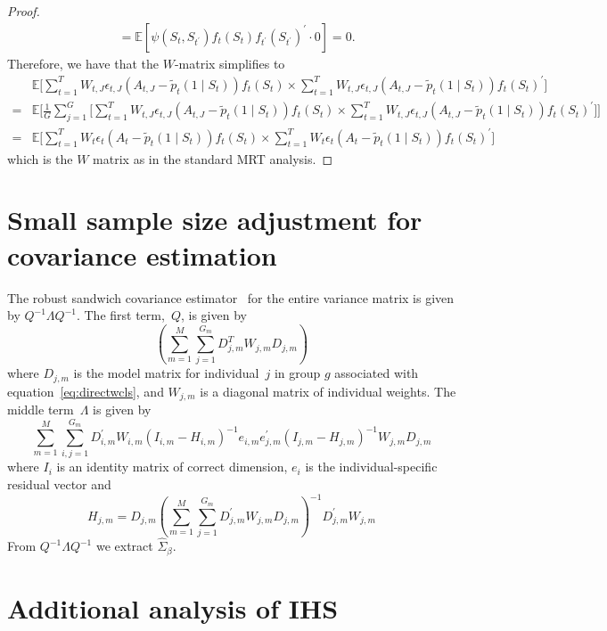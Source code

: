 \documentclass[12pt]{article}
\begin{document}
\begin{proof}
\begin{align*}
&= \mathbb{E} \left[ \psi (S_t, S_{t^\prime}) f_t (S_t) f_{t^\prime} (S_{t^\prime})^\prime \cdot 0 \right] = 0.
\end{align*}
Therefore, we have that the $W$-matrix simplifies to
\begin{align*}
 &\mathbb{E} \bigg[ \sum_{t=1}^T W_{t,J} \epsilon_{t,J} (A_{t,J} - \tilde{p}_t( 1 \mid S_t)) f_t(S_t) \times \sum_{t=1}^T W_{t,J} \epsilon_{t,J} (A_{t,J} - \tilde{p}_t( 1 \mid S_t)) f_t(S_t)^\prime
                  \bigg] \\
 =&\mathbb{E} \bigg[\frac{1}{G}  \sum_{j=1}^G \bigg[ \sum_{t=1}^T W_{t,J} \epsilon_{t,J} (A_{t,J} - \tilde{p}_t( 1 \mid S_t)) f_t(S_t) \times \sum_{t=1}^T W_{t,J} \epsilon_{t,J} (A_{t,J} - \tilde{p}_t( 1 \mid S_t)) f_t(S_t)^\prime
                  \bigg] \bigg] \\
 =&\mathbb{E} \bigg[ \sum_{t=1}^T W_{t} \epsilon_{t} (A_{t} - \tilde{p}_t( 1 \mid S_t)) f_t(S_t) \times \sum_{t=1}^T W_{t} \epsilon_{t} (A_{t} - \tilde{p}_t( 1 \mid S_t)) f_t(S_t)^\prime
                  \bigg]
\end{align*}
which is the $W$ matrix as in the standard MRT analysis.
\end{proof}

\section{Small sample size adjustment for covariance estimation}
\label{app:ssa}

The robust sandwich covariance estimator~\cite{Mancl2001} for the entire variance matrix is given by $Q^{-1} \Lambda Q^{-1}$.  The first term,~$Q$, is given by
\[
\left( \sum_{m=1}^M \sum_{j=1}^{G_m} D_{j,m}^T W_{j,m} D_{j,m} \right)
\]
where $D_{j,m}$ is the model matrix for individual~$j$ in group $g$ associated with
equation~\eqref{eq:directwcls}, and $W_{j,m}$ is a diagonal matrix of individual weights.
The middle term~$\Lambda$ is given by
\[
\sum_{m=1}^M \sum_{i,j=1}^{G_m} D_{i,m}^\prime W_{i,m} (I_{i,m} - H_{i,m})^{-1}
e_{i,m} e_{j,m}^\prime (I_{j,m} - H_{j,m})^{-1} W_{j,m} D_{j,m}
\]
where $I_i$ is an identity matrix of correct dimension, $e_i$ is the individual-specific residual
vector and
\[
H_{j,m} = D_{j,m}
\left( \sum_{m=1}^M \sum_{j=1}^{G_m} D_{j,m}^\prime W_{j,m} D_{j,m} \right)^{-1}
D_{j,m}^\prime W_{j,m}
\]
From $Q^{-1} \Lambda Q^{-1}$ we extract $\hat{\Sigma}_{\beta}$.

\section{Additional analysis of IHS}
\label{app:IHSadditionalanalysis}
\end{document}
